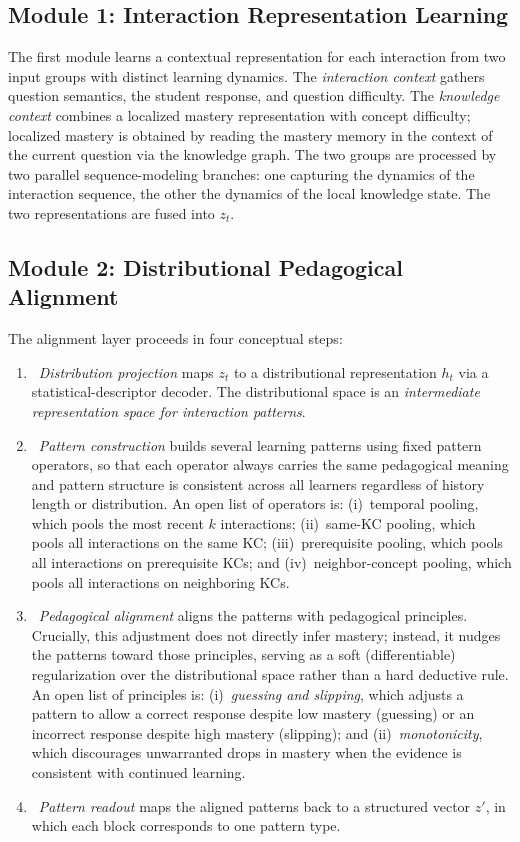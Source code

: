 \documentclass[conference]{IEEEtran}
\begin{document}
\subsection{Module 1: Interaction Representation Learning}
\label{sec:irl}

The first module learns a contextual representation for each interaction from two input groups with distinct learning dynamics. The \emph{interaction context} gathers question semantics, the student response, and question difficulty. The \emph{knowledge context} combines a localized mastery representation with concept difficulty; localized mastery is obtained by reading the mastery memory in the context of the current question via the knowledge graph. The two groups are processed by two parallel sequence-modeling branches: one capturing the dynamics of the interaction sequence, the other the dynamics of the local knowledge state. The two representations are fused into $z_t$.

\subsection{Module 2: Distributional Pedagogical Alignment}
\label{sec:dpa}

The alignment layer proceeds in four conceptual steps:

\begin{enumerate}
    \item~\emph{Distribution projection} maps $z_t$ to a distributional representation $h_t$ via a statistical-descriptor decoder. The distributional space is an \emph{intermediate representation space for interaction patterns}.
    \item~\emph{Pattern construction} builds several learning patterns using fixed pattern operators, so that each operator always carries the same pedagogical meaning and pattern structure is consistent across all learners regardless of history length or distribution. An open list of operators is: (i)~temporal pooling, which pools the most recent $k$ interactions; (ii)~same-KC pooling, which pools all interactions on the same KC; (iii)~prerequisite pooling, which pools all interactions on prerequisite KCs; and (iv)~neighbor-concept pooling, which pools all interactions on neighboring KCs.
    \item~\emph{Pedagogical alignment} aligns the patterns with pedagogical principles. Crucially, this adjustment does not directly infer mastery; instead, it nudges the patterns toward those principles, serving as a soft (differentiable) regularization over the distributional space rather than a hard deductive rule. An open list of principles is: (i)~\emph{guessing and slipping}, which adjusts a pattern to allow a correct response despite low mastery (guessing) or an incorrect response despite high mastery (slipping); and (ii)~\emph{monotonicity}, which discourages unwarranted drops in mastery when the evidence is consistent with continued learning.
    \item~\emph{Pattern readout} maps the aligned patterns back to a structured vector $z'$, in which each block corresponds to one pattern type.
\end{enumerate}
\end{document}
